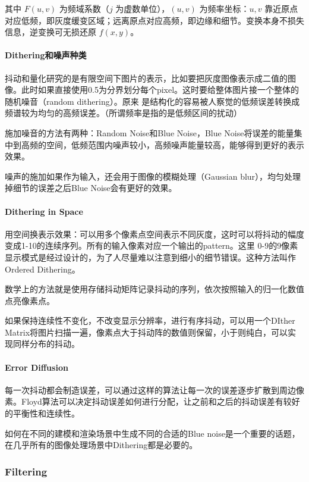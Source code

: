 \documentclass{ctexart}
\theoremstyle{cnthm}
\begin{document}
其中 $F(u,v)$ 为频域系数（$j$ 为虚数单位），$(u,v)$ 为频率坐标：$u,v$ 靠近原点对应低频，即灰度缓变区域；远离原点对应高频，即边缘和细节。变换本身不损失信息，逆变换可无损还原 $f(x,y)$。

\paragraph{Dithering和噪声种类}
抖动和量化研究的是有限空间下图片的表示，比如要把灰度图像表示成二值的图像。此时如果直接使用0.5为分界划分每个pixel。这时要给整体图片接一个整体的随机噪音（random dithering）。原来
是结构化的容易被人察觉的低频误差转换成频谱较为均匀的高频误差。（所谓频率是指的是低频区间的扰动）

施加噪音的方法有两种：Random Noise和Blue Noise，Blue Noise将误差的能量集中到高频的空间，低频范围内噪声较小，高频噪声能量较高，能够得到更好的表示效果。

噪声的施加如果作为输入，还会用于图像的模糊处理（Gaussian blur），均匀处理掉细节的误差之后Blue Noise会有更好的效果。

\paragraph{Dithering in Space}

用空间换表示效果：可以用多个像素点空间表示不同灰度，这时可以将抖动的幅度变成1-10的连续序列。所有的输入像素对应一个输出的pattern。这里
0-9的9像素显示模式是经过设计的，为了人尽量难以注意到细小的细节错误。这种方法叫作Ordered Dithering。

数学上的方法就是使用存储抖动矩阵记录抖动的序列，依次按照输入的归一化数值点亮像素点。

如果保持连续性不变化，不改变显示分辨率，进行有序抖动，可以用一个DIther Matrix将图片扫描一遍，像素点大于抖动阵的数值则保留，小于则纯白，可以实现同样分布的抖动。

\paragraph{Error Diffusion}

每一次抖动都会制造误差，可以通过这样的算法让每一次的误差逐步扩散到周边像素。Floyd算法可以决定抖动误差如何进行分配，让之前和之后的抖动误差有较好的平衡性和连续性。

如何在不同的建模和渲染场景中生成不同的合适的Blue noise是一个重要的话题，在几乎所有的图像处理场景中Dithering都是必要的。

\subsubsection{Filtering}
\end{document}
